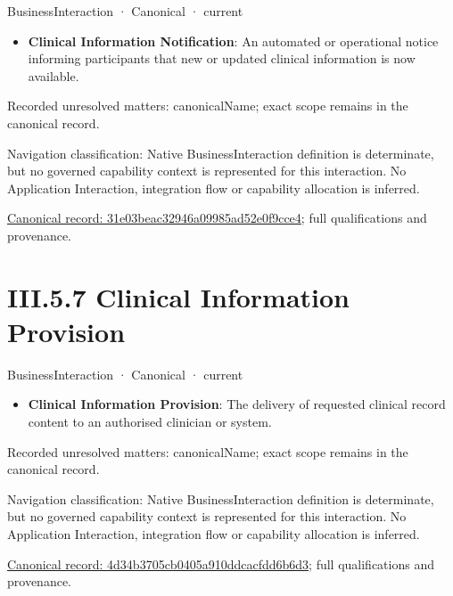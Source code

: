 \label{element:31e03beac32946a09985ad52e0f9cce4}
{\small BusinessInteraction · Canonical · current}\par

\begin{itemize}


\item \textbf{Clinical Information Notification}: An automated or operational notice informing participants that new or updated clinical information is now available.

\end{itemize}

{\small Recorded unresolved matters: canonicalName; exact scope remains in the canonical record.}\par
{\small Navigation classification: Native BusinessInteraction definition is determinate, but no governed capability context is represented for this interaction. No Application Interaction, integration flow or capability allocation is inferred.}\par
{\footnotesize \href{../../../../../../../continuum/business/business-interaction/31e03beac32946a09985ad52e0f9cce4.md}{Canonical record: 31e03beac32946a09985ad52e0f9cce4}; full qualifications and provenance.}\par
\section*{III.5.7 Clinical Information Provision}
\label{navigation:III.5.7}

\label{element:4d34b3705cb0405a910ddcacfdd6b6d3}
{\small BusinessInteraction · Canonical · current}\par

\begin{itemize}


\item \textbf{Clinical Information Provision}: The delivery of requested clinical record content to an authorised clinician or system.

\end{itemize}

{\small Recorded unresolved matters: canonicalName; exact scope remains in the canonical record.}\par
{\small Navigation classification: Native BusinessInteraction definition is determinate, but no governed capability context is represented for this interaction. No Application Interaction, integration flow or capability allocation is inferred.}\par
{\footnotesize \href{../../../../../../../continuum/business/business-interaction/4d34b3705cb0405a910ddcacfdd6b6d3.md}{Canonical record: 4d34b3705cb0405a910ddcacfdd6b6d3}; full qualifications and provenance.}\par
